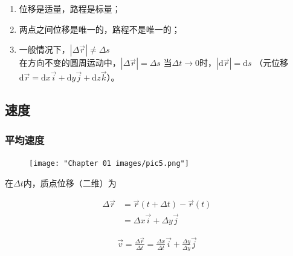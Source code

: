 \documentclass[
	12pt, %
	a4paper, %
]{myLegrandOrangeBook}
\newcommand{\rmd}{\mathrm{d}}
\begin{document}
    \begin{enumerate}
        \item 位移是适量，路程是标量；
        \item 两点之间位移是唯一的，路程不是唯一的；
        \item 一般情况下，\(\left|\Delta \overrightarrow{r}\right| \neq \Delta s\)
            \\
            在方向不变的圆周运动中，\(\left|\Delta \overrightarrow{r}\right| = \Delta s\)
            当\(\Delta t \rightarrow 0\)时，\(\left| \rmd \overrightarrow{r}\right| = \rmd s\)
            （元位移\(\rmd \overrightarrow{r} = \rmd x \overrightarrow{i} +
            \rmd y \overrightarrow{j} + \rmd z \overrightarrow{k}\)）。
    \end{enumerate}

\subsection{速度}

\subsubsection*{平均速度}

    \begin{figure}
        \centering
        \texttt{[image: "Chapter 01 images/pic5.png"]}
        \label{pic5}
    \end{figure}

    在\(\Delta t\)内，质点位移（二维）为

    \begin{align*}
        \Delta \overrightarrow{r} &= \overrightarrow{r} \left(t + \Delta t\right) -
        \overrightarrow{r} \left(t\right)
        \\
        &= \Delta x \overrightarrow{i} + \Delta y \overrightarrow{j}
    \end{align*}

    \vspace{1em}
        \begin{definition}[平均速度]
        \begin{align}
            \overrightarrow{v} = \frac{\Delta \overrightarrow{r}}{\Delta t} =
            \frac{\Delta x}{\Delta t} \overrightarrow{i} + \frac{\Delta y}{\Delta y} \overrightarrow{j}
        \end{align}
    \end{definition}
\end{document}
